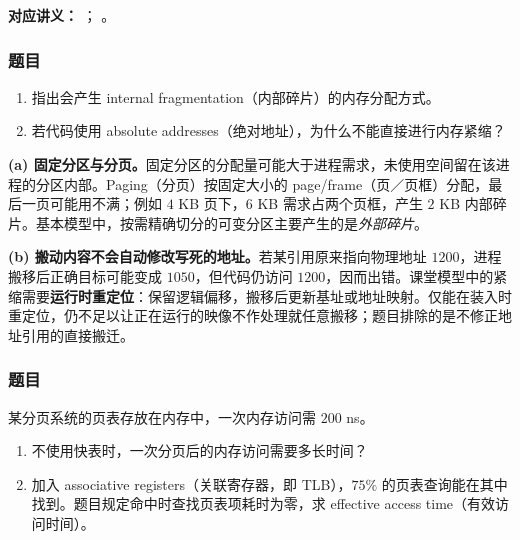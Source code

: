 \nopagebreak[4]

\textbf{对应讲义：}
；
。

\subsubsection*{题目}

\begin{enumerate}[label=(\alph*)]
  \item 指出会产生 internal fragmentation（内部碎片）的内存分配方式。
  \item 若代码使用 absolute addresses（绝对地址），为什么不能直接进行内存紧缩？
\end{enumerate}

\begin{checkedsolution}
\nopagebreak[4]
\textbf{(a) 固定分区与分页。}固定分区的分配量可能大于进程需求，未使用空间留在该进程的分区内部。Paging（分页）按固定大小的 page/frame（页／页框）分配，最后一页可能用不满；例如 $4$ KB 页下，$6$ KB 需求占两个页框，产生 $2$ KB 内部碎片。基本模型中，按需精确切分的可变分区主要产生的是\emph{外部碎片}。

\textbf{(b) 搬动内容不会自动修改写死的地址。}若某引用原来指向物理地址 $1200$，进程搬移后正确目标可能变成 $1050$，但代码仍访问 $1200$，因而出错。课堂模型中的紧缩需要\textbf{运行时重定位}：保留逻辑偏移，搬移后更新基址或地址映射。仅能在装入时重定位，仍不足以让正在运行的映像不作处理就任意搬移；题目排除的是不修正地址引用的直接搬迁。
\end{checkedsolution}

\nopagebreak[4]

\subsubsection*{题目}

某分页系统的页表存放在内存中，一次内存访问需 $200$ ns。
\begin{enumerate}[label=(\alph*)]
  \item 不使用快表时，一次分页后的内存访问需要多长时间？
  \item 加入 associative registers（关联寄存器，即 TLB），$75\%$ 的页表查询能在其中找到。题目规定命中时查找页表项耗时为零，求 effective access time（有效访问时间）。
\end{enumerate}

